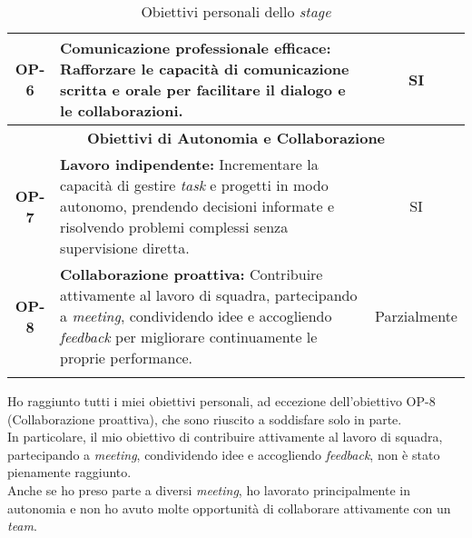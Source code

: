 \begin{longtable}{|c|>{\centering\arraybackslash}p{}|c|}
    \hline
    \textbf{OP-6} & \textbf{Comunicazione professionale efficace:} Rafforzare le capacità di comunicazione scritta e orale per facilitare il dialogo e le collaborazioni.& SI \\
    \hline
    \multicolumn{3}{|c|}{\rowcolor{green!30} \textbf{Obiettivi di Autonomia e Collaborazione}} \\
    \hline
    \textbf{OP-7} & \textbf{Lavoro indipendente:} Incrementare la capacità di gestire \textit{task} e progetti in modo autonomo, prendendo decisioni informate e risolvendo problemi complessi senza supervisione diretta.& SI \\
    \hline
    \textbf{OP-8} & \textbf{Collaborazione proattiva:} Contribuire attivamente al lavoro di squadra, partecipando a \textit{meeting}, condividendo idee e accogliendo \textit{feedback} per migliorare continuamente le proprie performance. & Parzialmente\\
    \hline
    \caption{Obiettivi personali dello \textit{stage}} %
    \label{tab:raggiungimento-obiettivi-personali-stage} %
\end{longtable}

\noindent Ho raggiunto tutti i miei obiettivi personali, ad eccezione dell'obiettivo OP-8 (Collaborazione proattiva), che sono riuscito a soddisfare solo in parte.\\

\noindent In particolare, il mio obiettivo di contribuire attivamente al lavoro di squadra, partecipando a \textit{meeting}, condividendo idee e accogliendo \textit{feedback}, non è stato pienamente raggiunto.\\
Anche se ho preso parte a diversi \textit{meeting}, ho lavorato principalmente in autonomia e non ho avuto molte opportunità di collaborare attivamente con un \textit{team}.